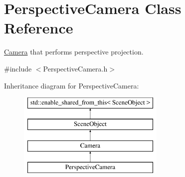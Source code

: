 \hypertarget{class_perspective_camera}{}\section{Perspective\+Camera Class Reference}
\label{class_perspective_camera}


\hyperlink{class_camera}{Camera} that performs perspective projection.




{\ttfamily \#include $<$Perspective\+Camera.\+h$>$}

Inheritance diagram for Perspective\+Camera\+:\begin{figure}[H]
\begin{center}
\leavevmode
\includegraphics[height=4.000000cm]{class_perspective_camera}
\end{center}
\end{figure}
